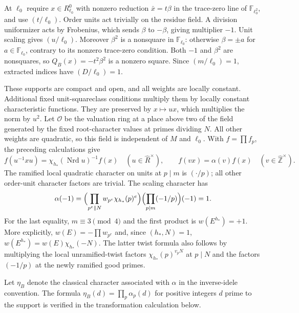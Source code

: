 At $\ell_0$ require $x\in R_{\ell_0}^0$ with nonzero reduction
$\bar x=t\beta$ in the trace-zero line of $\mathbb F_{\ell_0^2}$,
and use $(t/\ell_0)$.  Order units act trivially on the residue
field.  A division uniformizer acts by Frobenius, which sends
$\beta$ to $-\beta$, giving multiplier $-1$.
Unit scaling gives $(u/\ell_0)$.  Moreover $\beta^2$ is a nonsquare
in $\mathbb F_{\ell_0}$: otherwise $\beta=\pm a$ for
$a\in\mathbb F_{\ell_0}$, contrary to its nonzero trace-zero condition.
Both $-1$ and $\beta^2$ are nonsquares, so $Q_B(x)=-t^2\beta^2$
is a nonzero square.  Since $(m/\ell_0)=1$, extracted indices have
$(D/\ell_0)=1$.

These supports are compact and open, and all weights are locally
constant.  Additional fixed unit-squareclass conditions multiply
them by locally constant characteristic functions.  They are
preserved by $x\mapsto ux$, which multiplies the norm by $u^2$.
Let $\mathcal O$ be the valuation ring at a place above two of the
field generated by the fixed root-character values at primes
dividing $N$.  All other weights are quadratic, so this field is
independent of $M$ and $\ell_0$.
With $f=\prod f_p$, the preceding calculations give
\[
 f(u^{-1}xu)=\chi_{h_*}(\operatorname{Nrd}u)^{-1}f(x)
       \quad (u\in\widehat R^\times),
 \qquad f(vx)=\alpha(v)f(x)\quad(v\in\widehat{\mathbb Z}^{\times}).
\]
The ramified local quadratic character on units at $p\mid m$ is
$(\cdot/p)$; all other order-unit character factors are trivial.
The scaling character has
\[
 \alpha(-1)=
 \Bigl(\prod_{p^e\Vert N}w_{p^e}\chi_{h_*}(p)^e\Bigr)
             \Bigl(\prod_{p\mid m}(-1/p)\Bigr)(-1)=1.
\]
For the last equality, $m\equiv3\pmod4$ and the first product is
$w(E^{h_*})=+1$.  More explicitly,
$w(E)=-\prod w_{p^e}$ and, since $(h_*,N)=1$,
$w(E^{h_*})=w(E)\chi_{h_*}(-N)$.
The latter twist formula also follows by multiplying the local
unramified-twist factors $\chi_{h_*}(p)^{v_pN}$ at $p\mid N$
and the factors $(-1/p)$ at the newly ramified good primes.

Let $\eta_B$ denote the classical character associated with $\alpha$
in the inverse-idele convention.  The formula
$\eta_B(d)=\prod_p\alpha_p(d)$ for positive integers $d$ prime to
the support is verified in the transformation calculation below.

